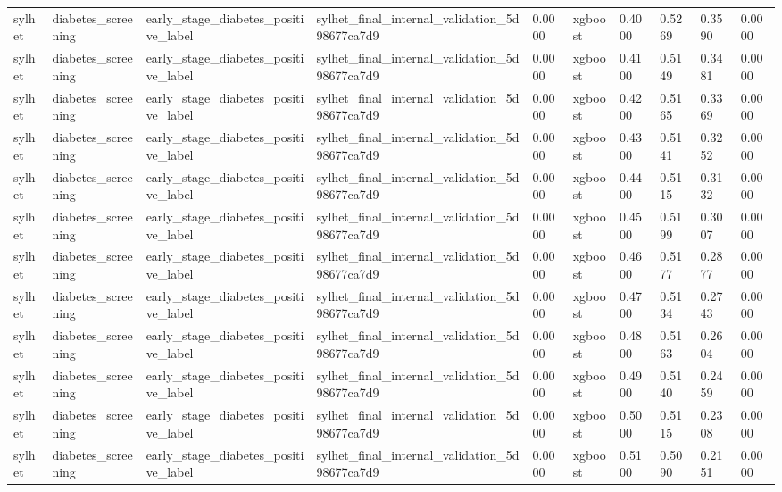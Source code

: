 \begin{tabular}{llllllllll}
sylhet & diabetes\_screening & early\_stage\_diabetes\_positive\_label & sylhet\_final\_internal\_validation\_5d98677ca7d9 & 0.0000 & xgboost & 0.4000 & 0.5269 & 0.3590 & 0.0000 \\
sylhet & diabetes\_screening & early\_stage\_diabetes\_positive\_label & sylhet\_final\_internal\_validation\_5d98677ca7d9 & 0.0000 & xgboost & 0.4100 & 0.5149 & 0.3481 & 0.0000 \\
sylhet & diabetes\_screening & early\_stage\_diabetes\_positive\_label & sylhet\_final\_internal\_validation\_5d98677ca7d9 & 0.0000 & xgboost & 0.4200 & 0.5165 & 0.3369 & 0.0000 \\
sylhet & diabetes\_screening & early\_stage\_diabetes\_positive\_label & sylhet\_final\_internal\_validation\_5d98677ca7d9 & 0.0000 & xgboost & 0.4300 & 0.5141 & 0.3252 & 0.0000 \\
sylhet & diabetes\_screening & early\_stage\_diabetes\_positive\_label & sylhet\_final\_internal\_validation\_5d98677ca7d9 & 0.0000 & xgboost & 0.4400 & 0.5115 & 0.3132 & 0.0000 \\
sylhet & diabetes\_screening & early\_stage\_diabetes\_positive\_label & sylhet\_final\_internal\_validation\_5d98677ca7d9 & 0.0000 & xgboost & 0.4500 & 0.5199 & 0.3007 & 0.0000 \\
sylhet & diabetes\_screening & early\_stage\_diabetes\_positive\_label & sylhet\_final\_internal\_validation\_5d98677ca7d9 & 0.0000 & xgboost & 0.4600 & 0.5177 & 0.2877 & 0.0000 \\
sylhet & diabetes\_screening & early\_stage\_diabetes\_positive\_label & sylhet\_final\_internal\_validation\_5d98677ca7d9 & 0.0000 & xgboost & 0.4700 & 0.5134 & 0.2743 & 0.0000 \\
sylhet & diabetes\_screening & early\_stage\_diabetes\_positive\_label & sylhet\_final\_internal\_validation\_5d98677ca7d9 & 0.0000 & xgboost & 0.4800 & 0.5163 & 0.2604 & 0.0000 \\
sylhet & diabetes\_screening & early\_stage\_diabetes\_positive\_label & sylhet\_final\_internal\_validation\_5d98677ca7d9 & 0.0000 & xgboost & 0.4900 & 0.5140 & 0.2459 & 0.0000 \\
sylhet & diabetes\_screening & early\_stage\_diabetes\_positive\_label & sylhet\_final\_internal\_validation\_5d98677ca7d9 & 0.0000 & xgboost & 0.5000 & 0.5115 & 0.2308 & 0.0000 \\
sylhet & diabetes\_screening & early\_stage\_diabetes\_positive\_label & sylhet\_final\_internal\_validation\_5d98677ca7d9 & 0.0000 & xgboost & 0.5100 & 0.5090 & 0.2151 & 0.0000 \\

\end{tabular}
